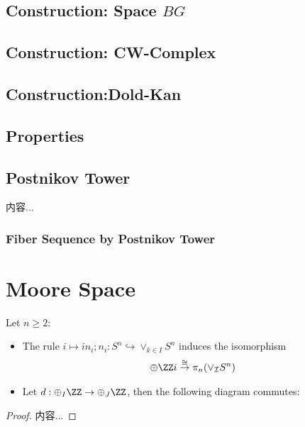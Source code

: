 \documentclass[Total.tex]{subfiles}
\begin{document}
			\subsection{Construction: Space $BG$}
			\subsection{Construction: CW-Complex}
			\subsection{Construction:Dold-Kan}
			
			\subsection{Properties}
			\subsection{Postnikov Tower}
				\begin{Def}
					内容...
				\end{Def}
				
				\subsubsection{Fiber Sequence by Postnikov Tower}
		\section{Moore Space}
			\begin{lemma}
				Let $n\geq 2$:
				\begin{itemize}
					\item The rule $i\mapsto in_i;n_i:S^n\hookrightarrow \vee_{k \in I} S^n$ induces the isomorphism
					\begin{gather*}
						\oplus \ZZ i\stackrel{\cong}{\rightarrow } \pi_n(\vee_\mathcal{I} S^n)
					\end{gather*}
					\item Let $d:\oplus_{I} \ZZ\rightarrow \oplus_{J} \ZZ$, then the following diagram commutes:
					\begin{center}
					\end{center}
				\end{itemize}
			\end{lemma}
			\begin{proof}
				内容...
			\end{proof}
			
\end{document}
